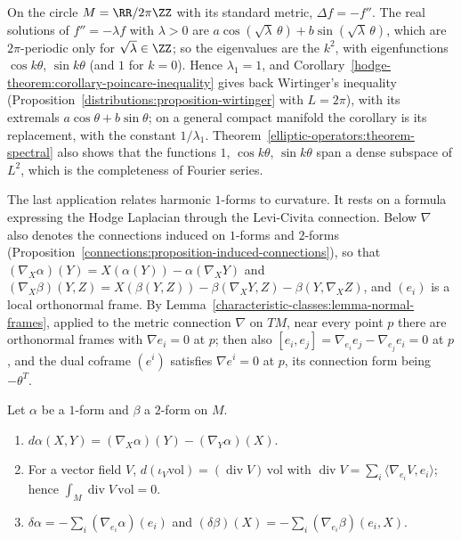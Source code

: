 \begin{example}\label{hodge-theorem:example-wirtinger}
On the circle $M = \RR/2\pi\ZZ$ with its standard metric, $\Delta f = -f''$. The real solutions of $f'' = -\lambda f$ with $\lambda > 0$ are $a\cos(\sqrt\lambda\,\theta) + b\sin(\sqrt\lambda\,\theta)$, which are
$2\pi$-periodic only for $\sqrt\lambda \in \ZZ$; so the eigenvalues are the $k^2$, with eigenfunctions $\cos k\theta$, $\sin k\theta$ (and $1$ for $k = 0$). Hence $\lambda_1 = 1$, and
Corollary~\ref{hodge-theorem:corollary-poincare-inequality} gives back Wirtinger's inequality (Proposition~\ref{distributions:proposition-wirtinger} with $L = 2\pi$), with its extremals
$a\cos\theta + b\sin\theta$; on a general compact manifold the corollary is its replacement, with the constant $1/\lambda_1$. Theorem~\ref{elliptic-operators:theorem-spectral} also shows that the functions $1$, $\cos k\theta$, $\sin k\theta$ span a dense subspace of $L^2$, which is the completeness of Fourier series.
\end{example}

The last application relates harmonic $1$-forms to curvature. It rests on a formula expressing the Hodge Laplacian through the Levi-Civita connection. Below $\nabla$ also denotes the connections
induced on $1$-forms and $2$-forms (Proposition~\ref{connections:proposition-induced-connections}), so that $(\nabla_X\alpha)(Y) = X(\alpha(Y)) - \alpha(\nabla_XY)$ and
$(\nabla_X\beta)(Y, Z) = X(\beta(Y, Z)) - \beta(\nabla_XY, Z) - \beta(Y, \nabla_XZ)$, and $(e_i)$ is a local orthonormal frame. By Lemma~\ref{characteristic-classes:lemma-normal-frames}, applied to the
metric connection $\nabla$ on $TM$, near every point $p$ there are orthonormal frames with $\nabla e_i = 0$ at $p$; then also $[e_i, e_j] = \nabla_{e_i}e_j - \nabla_{e_j}e_i = 0$ at $p$, and the dual coframe
$(e^i)$ satisfies $\nabla e^i = 0$ at $p$, its connection form being $-\theta^T$.

\begin{lemma}\label{hodge-theorem:lemma-codifferential-connection}
Let $\alpha$ be a $1$-form and $\beta$ a $2$-form on $M$.
\begin{enumerate}
\item $d\alpha(X, Y) = (\nabla_X\alpha)(Y) - (\nabla_Y\alpha)(X)$.
\item For a vector field $V$, $d(\iota_V\mathrm{vol}) = (\operatorname{div}V)\,\mathrm{vol}$ with $\operatorname{div}V = \sum_i\langle\nabla_{e_i}V, e_i\rangle$; hence $\int_M\operatorname{div}V\,\mathrm{vol} = 0$.
\item $\delta\alpha = -\sum_i(\nabla_{e_i}\alpha)(e_i)$ and $(\delta\beta)(X) = -\sum_i(\nabla_{e_i}\beta)(e_i, X)$.
\end{enumerate}
\end{lemma}

